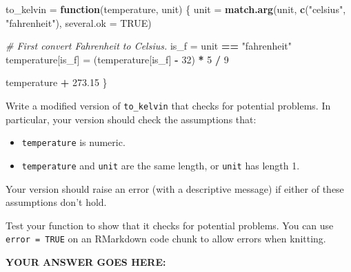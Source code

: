 \documentclass[
]{article}
\newenvironment{Shaded}{\begin{snugshade}}{\end{snugshade}}
\newcommand{\CommentTok}[1]{\textcolor[rgb]{0.56,0.35,0.01}{\textit{#1}}}
\newcommand{\ControlFlowTok}[1]{\textcolor[rgb]{0.13,0.29,0.53}{\textbf{#1}}}
\newcommand{\DataTypeTok}[1]{\textcolor[rgb]{0.13,0.29,0.53}{#1}}
\newcommand{\DecValTok}[1]{\textcolor[rgb]{0.00,0.00,0.81}{#1}}
\newcommand{\FloatTok}[1]{\textcolor[rgb]{0.00,0.00,0.81}{#1}}
\newcommand{\KeywordTok}[1]{\textcolor[rgb]{0.13,0.29,0.53}{\textbf{#1}}}
\newcommand{\NormalTok}[1]{#1}
\newcommand{\OperatorTok}[1]{\textcolor[rgb]{0.81,0.36,0.00}{\textbf{#1}}}
\newcommand{\OtherTok}[1]{\textcolor[rgb]{0.56,0.35,0.01}{#1}}
\newcommand{\StringTok}[1]{\textcolor[rgb]{0.31,0.60,0.02}{#1}}
\providecommand{\tightlist}{%
  \setlength{\itemsep}{0pt}\setlength{\parskip}{0pt}}
\begin{document}
\begin{Shaded}
\begin{Highlighting}[]
\NormalTok{to\_kelvin =}\StringTok{ }\ControlFlowTok{function}\NormalTok{(temperature, unit) \{}
\NormalTok{  unit =}\StringTok{ }\KeywordTok{match.arg}\NormalTok{(unit, }\KeywordTok{c}\NormalTok{(}\StringTok{"celsius"}\NormalTok{, }\StringTok{"fahrenheit"}\NormalTok{), }\DataTypeTok{several.ok =} \OtherTok{TRUE}\NormalTok{)}

  \CommentTok{\# First convert Fahrenheit to Celsius.}
\NormalTok{  is\_f =}\StringTok{ }\NormalTok{unit }\OperatorTok{==}\StringTok{ "fahrenheit"}
\NormalTok{  temperature[is\_f] =}\StringTok{ }\NormalTok{(temperature[is\_f] }\OperatorTok{{-}}\StringTok{ }\DecValTok{32}\NormalTok{) }\OperatorTok{*}\StringTok{ }\DecValTok{5} \OperatorTok{/}\StringTok{ }\DecValTok{9}

\NormalTok{  temperature }\OperatorTok{+}\StringTok{ }\FloatTok{273.15}
\NormalTok{\}}
\end{Highlighting}
\end{Shaded}

Write a modified version of \texttt{to\_kelvin} that checks for
potential problems. In particular, your version should check the
assumptions that:

\begin{itemize}
\tightlist
\item
  \texttt{temperature} is numeric.
\item
  \texttt{temperature} and \texttt{unit} are the same length, or
  \texttt{unit} has length 1.
\end{itemize}

Your version should raise an error (with a descriptive message) if
either of these assumptions don't hold.

Test your function to show that it checks for potential problems. You
can use \texttt{error\ =\ TRUE} on an RMarkdown code chunk to allow
errors when knitting.

\textbf{YOUR ANSWER GOES HERE:}
\end{document}
